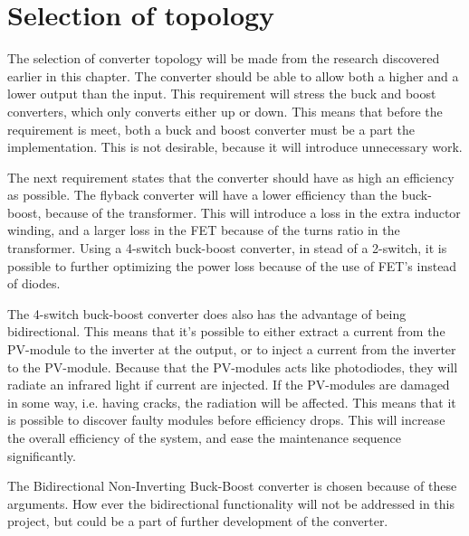 \section{Selection of topology}
The selection of converter topology will be made from the research discovered earlier in this chapter. The converter should be able to allow both a higher and a lower output than the input. This requirement will stress the buck and boost converters, which only converts either up or down. This means that before the requirement is meet, both a buck and boost converter must be a part the implementation. This is not desirable, because it will introduce unnecessary work.  

The next requirement states that the converter should have as high an efficiency as possible. The flyback converter will have a lower efficiency than the buck-boost, because of the transformer. This will introduce a loss in the extra inductor winding, and a larger loss in the FET because of the turns ratio in the transformer. Using a 4-switch buck-boost converter, in stead of a 2-switch, it is possible to further optimizing the power loss because of the use of FET's instead of diodes. 

The 4-switch buck-boost converter does also has the advantage of being bidirectional. This means that it's possible to either extract a current from the PV-module to the inverter at the output, or to inject a current from the inverter to the PV-module. Because that the PV-modules acts like photodiodes, they will radiate an infrared light if current are injected. If the PV-modules are damaged in some way, i.e. having cracks, the radiation will be affected. This means that it is possible to discover faulty modules before efficiency drops. This will increase the overall efficiency of the system, and ease the maintenance sequence significantly. 

The Bidirectional Non-Inverting Buck-Boost converter is chosen because of these arguments. How ever the bidirectional functionality will not be addressed in this project, but could be a part of further development of the converter. 






 
